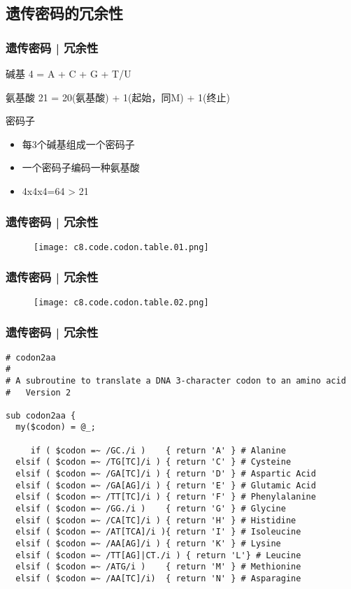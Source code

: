 \subsection{遗传密码的冗余性}
\begin{frame}
  \frametitle{遗传密码 | 冗余性}
  \begin{block}{碱基}
    4 = A + C + G + T/U
  \end{block}
  \pause
  \begin{block}{氨基酸}
    21 = 20(氨基酸) + 1(起始，同M) + 1(终止)
  \end{block}
  \pause
  \begin{block}{密码子}
    \begin{itemize}
      \item 每3个碱基组成一个密码子
      \item 一个密码子编码一种氨基酸
      \item 4x4x4=64 > 21
    \end{itemize}
  \end{block}
\end{frame}

\begin{frame}
  \frametitle{遗传密码 | 冗余性}
  \begin{figure}
    \centering
    \texttt{[image: c8.code.codon.table.01.png]}
  \end{figure}
\end{frame}

\begin{frame}
  \frametitle{遗传密码 | 冗余性}
  \begin{figure}
    \centering
    \texttt{[image: c8.code.codon.table.02.png]}
  \end{figure}
\end{frame}

\begin{frame}[fragile]
  \frametitle{遗传密码 | 冗余性}
\begin{lstlisting}[firstnumber=1,basicstyle=\scriptsize\tt,numberstyle=\tiny]
# codon2aa
#
# A subroutine to translate a DNA 3-character codon to an amino acid
#   Version 2

sub codon2aa {
  my($codon) = @_;
     
     if ( $codon =~ /GC./i )    { return 'A' } # Alanine
  elsif ( $codon =~ /TG[TC]/i ) { return 'C' } # Cysteine
  elsif ( $codon =~ /GA[TC]/i ) { return 'D' } # Aspartic Acid
  elsif ( $codon =~ /GA[AG]/i ) { return 'E' } # Glutamic Acid
  elsif ( $codon =~ /TT[TC]/i ) { return 'F' } # Phenylalanine
  elsif ( $codon =~ /GG./i )    { return 'G' } # Glycine
  elsif ( $codon =~ /CA[TC]/i ) { return 'H' } # Histidine
  elsif ( $codon =~ /AT[TCA]/i ){ return 'I' } # Isoleucine
  elsif ( $codon =~ /AA[AG]/i ) { return 'K' } # Lysine
  elsif ( $codon =~ /TT[AG]|CT./i ) { return 'L'} # Leucine
  elsif ( $codon =~ /ATG/i )    { return 'M' } # Methionine
  elsif ( $codon =~ /AA[TC]/i)  { return 'N' } # Asparagine
\end{lstlisting}
\end{frame}

